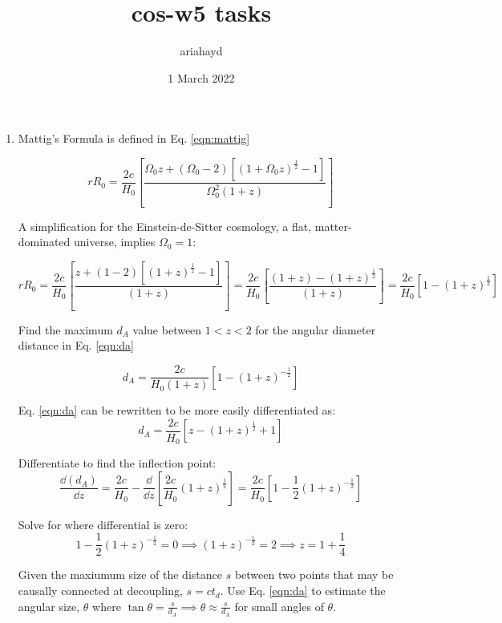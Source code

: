 \documentclass{paper}
\title{cos-w5 tasks}
\author{ariahayd}
\date{1 March 2022}
\begin{document}
 

\maketitle

\begin{enumerate}
    \item %
      Mattig's Formula is defined in Eq. \ref{eqn:mattig}

      \begin{equation}
        r R_0 = \frac{2c}{H_0}\left[ \frac{\Omega_0 z + 
        ( \Omega_0 -2 )[(1+\Omega_0 z)^\frac{1}{2} - 1]}
        {\Omega_0^2 (1+z)}\right]
        \label{eqn:mattig}
      \end{equation}

      A simplification for the Einstein-de-Sitter cosmology, a flat,
      matter-dominated universe, implies \(\Omega_0 = 1\):

      \[ r R_0 = \frac{2c}{H_0}\left[\frac{z+(1-2)[(1+z)^\frac{1}{2}-1]}
        {(1+z)}\right]
        = \frac{2c}{H_0}\left[ \frac{(1+z)-(1+z)^\frac{1}{2}}{(1+z)}\right]
        = \frac{2c}{H_0}\left[ 1-(1+z)^\frac{1}{2}\right]
      \]

      Find the maximum \(d_A\) value between \(1<z<2\) for the angular
      diameter distance in Eq. \ref{eqn:da}

      \begin{equation}
        d_A = \frac{2c}{H_0(1+z)}\left[1-(1+z)^{-\frac{1}{2}}\right]
        \label{eqn:da}
      \end{equation}

      Eq. \ref{eqn:da} can be rewritten to be more easily differentiated as:
      \[
        d_A = \frac{2c}{H_0}\left[z-(1+z)^\frac{1}{2} +1\right]
      \]

      Differentiate to find the inflection point:
      \[
        \frac{\dd{(d_A)}}{\dd{z}} = \frac{2c}{H_0} - 
        \frac{\dd{}}{\dd{z}}\left[\frac{2c}{H_0}(1+z)^\frac{1}{2}\right]
        = \frac{2c}{H_0}\left[1-\frac{1}{2}(1+z)^{-\frac{1}{2}}\right]
      \]

      Solve for where differential is zero:
      \[
        1-\frac{1}{2}(1+z)^{-\frac{1}{2}} = 0
        \implies (1+z)^{-\frac{1}{2}} = 2 \implies z = 1 + \frac{1}{4}
      \]

      Given the maxiumum size of the distance \(s\) between two points that
      may be causally connected at decoupling, \(s=ct_d\). Use Eq.
      \ref{eqn:da} to estimate the angular size, \(\theta\) where
      \(\tan{\theta} = \frac{s}{d_A} \implies \theta \approx \frac{s}{d_A}\)
      for small angles of \(\theta\).


\end{enumerate}
\end{document}
